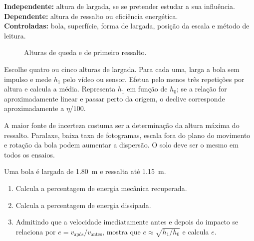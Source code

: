 \documentclass[11pt,a4paper,openany]{book}
\newcounter{exercicio}[chapter]
\renewcommand{\theexercicio}{\thechapter.\arabic{exercicio}}
\newenvironment{exercicio}[1][]%
{\refstepcounter{exercicio}%
\begin{tcolorbox}[breakable,colback=white,colframe=eublue!70,
 title={Exercício \theexercicio\if\relax\detokenize{#1}\relax\else\ --- #1\fi},fonttitle=\bfseries]}%
{\end{tcolorbox}}
\begin{document}
\begin{variaveis}
\textbf{Independente:} altura de largada, se se pretender estudar a sua influência.\\
\textbf{Dependente:} altura de ressalto ou eficiência energética.\\
\textbf{Controladas:} bola, superfície, forma de largada, posição da escala e método de leitura.
\end{variaveis}

\begin{figure}[H]
\centering
{}
\caption{Alturas de queda e de primeiro ressalto.}
\end{figure}

\begin{metodo}
Escolhe quatro ou cinco alturas de largada. Para cada uma, larga a bola sem impulso e mede $h_1$ pelo vídeo ou sensor. Efetua pelo menos três repetições por altura e calcula a média. Representa $h_1$ em função de $h_0$; se a relação for aproximadamente linear e passar perto da origem, o declive corresponde aproximadamente a $\eta/100$.
\end{metodo}

\begin{erros}
A maior fonte de incerteza costuma ser a determinação da altura máxima do ressalto. Paralaxe, baixa taxa de fotogramas, escala fora do plano do movimento e rotação da bola podem aumentar a dispersão. O solo deve ser o mesmo em todos os ensaios.
\end{erros}

\begin{exercicio}[Energia e coeficiente de restituição]
Uma bola é largada de \SI{1.80}{m} e ressalta até \SI{1.15}{m}.
\begin{enumerate}[label=\alph*)]
\item Calcula a percentagem de energia mecânica recuperada.
\item Calcula a percentagem de energia dissipada.
\item Admitindo que a velocidade imediatamente antes e depois do impacto se relaciona por $e=v_{\text{após}}/v_{\text{antes}}$, mostra que $e\approx\sqrt{h_1/h_0}$ e calcula $e$.
\end{enumerate}
\end{exercicio}
\end{document}
